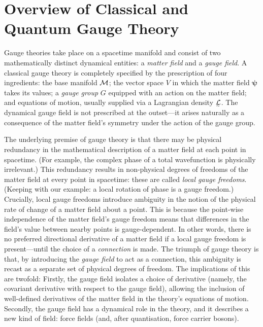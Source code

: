 \section{Overview of Classical and Quantum Gauge Theory}
\label{sec:overview-of-gauge-theory}

Gauge theories take place on a spacetime manifold and consist of two mathematically distinct dynamical entities: a \emph{matter field} and a \emph{gauge field}.
A classical gauge theory is completely specified by the prescription of four ingredients: the base manifold $\cal M$; the vector space $V$ in which the matter field $\bm ψ$ takes its values; a \emph{gauge group} $G$ equipped with an action on the matter field; and equations of motion, usually supplied via a Lagrangian density $\LL$.
The dynamical gauge field is not prescribed at the outset---it arises naturally as a consequence of the matter field's symmetry under the action of the gauge group.

The underlying premise of gauge theory is that there may be physical redundancy in the mathematical description of a matter field at each point in spacetime.
(For example, the complex phase of a total wavefunction is physically irrelevant.)
This redundancy results in non-physical degrees of freedoms of the matter field at every point in spacetime: these are called \emph{local gauge freedoms}.
(Keeping with our example: a local rotation of phase is a gauge freedom.)
Crucially, local gauge freedoms introduce ambiguity in the notion of the physical rate of change of a matter field about a point.
This is because the point-wise independence of the matter field's gauge freedom means that differences in the field's value between nearby points is gauge-dependent.
In other words, there is no preferred directional derivative of a matter field if a local gauge freedom is present---until the choice of a \emph{connection} is made.
The triumph of gauge theory is that, by introducing the \emph{gauge field} to act as a connection, this ambiguity is recast as a separate set of physical degrees of freedom.
The implications of this are twofold:
Firstly, the gauge field isolates a choice of derivative (namely, the covariant derivative with respect to the gauge field), allowing the inclusion of well-defined derivatives of the matter field in the theory's equations of motion.
Secondly, the gauge field has a dynamical role in the theory, and it describes a new kind of field: force fields (and, after quantisation, force carrier bosons).



